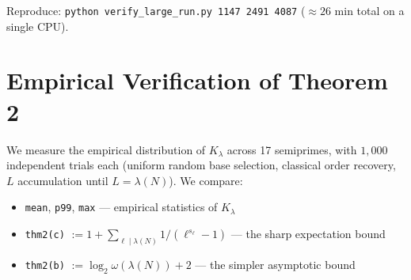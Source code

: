 \documentclass[11pt]{article}
\begin{document}
Reproduce: \texttt{python verify\_large\_run.py 1147 2491 4087} ($\approx 26$ min total on a single CPU).

\section{Empirical Verification of Theorem 2}
\label{app:k-lambda}

We measure the empirical distribution of $K_\lambda$ across 17 semiprimes, with $1{,}000$ independent trials each (uniform random base selection, classical order recovery, $L$ accumulation until $L = \lambda(N)$). We compare:
\begin{itemize}
  \item \texttt{mean}, \texttt{p99}, \texttt{max} --- empirical statistics of $K_\lambda$
  \item \texttt{thm2(c)} $:= 1 + \sum_{\ell \mid \lambda(N)} 1/(\ell^{s_\ell} - 1)$ --- the sharp expectation bound
  \item \texttt{thm2(b)} $:= \log_2 \omega(\lambda(N)) + 2$ --- the simpler asymptotic bound
\end{itemize}
\end{document}
